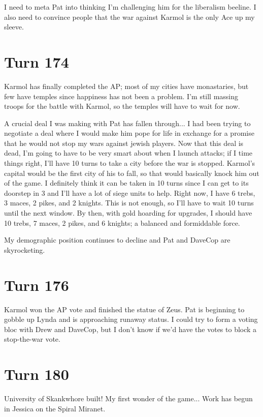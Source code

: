 \documentclass[10pt]{article}
\begin{document}
I need to meta Pat into thinking I'm challenging him for the
liberalism beeline. I also need to convince people that the war
against Karmol is the only Ace up my sleeve.

\section*{Turn 174}

Karmol has finally completed the AP; most of my cities have
monastaries, but few have temples since happiness has not been a
problem. I'm still massing troops for the battle with Karmol, so the
temples will have to wait for now.

A crucial deal I was making with Pat has fallen through... I had been
trying to negotiate a deal where I would make him pope for life in
exchange for a promise that he would not stop my wars against jewish
players. Now that this deal is dead, I'm going to have to be very
smart about when I launch attacks; if I time things right, I'll have
10 turns to take a city before the war is stopped. Karmol's capital
would be the first city of his to fall, so that would basically knock
him out of the game. I definitely think it can be taken in 10 turns
since I can get to its doorstep in 3 and I'll have a lot of siege
units to help. Right now, I have 6 trebs, 3 maces, 2 pikes, and 2
knights. This is not enough, so I'll have to wait 10 turns until the
next window. By then, with gold hoarding for upgrades, I should have
10 trebs, 7 maces, 2 pikes, and 6 knights; a balanced and formiddable
force.

My demographic position continues to decline and Pat and DaveCop are skyrocketing.

\section*{Turn 176}

Karmol won the AP vote and finished the statue of Zeus. Pat is
beginning to gobble up Lynda and is approaching runaway status. I
could try to form a voting bloc with Drew and DaveCop, but I don't
know if we'd have the votes to block a stop-the-war vote.

\section*{Turn 180}

University of Skankwhore built! My first wonder of the game... Work
has begun in Jessica on the Spiral Miranet.
\end{document}
